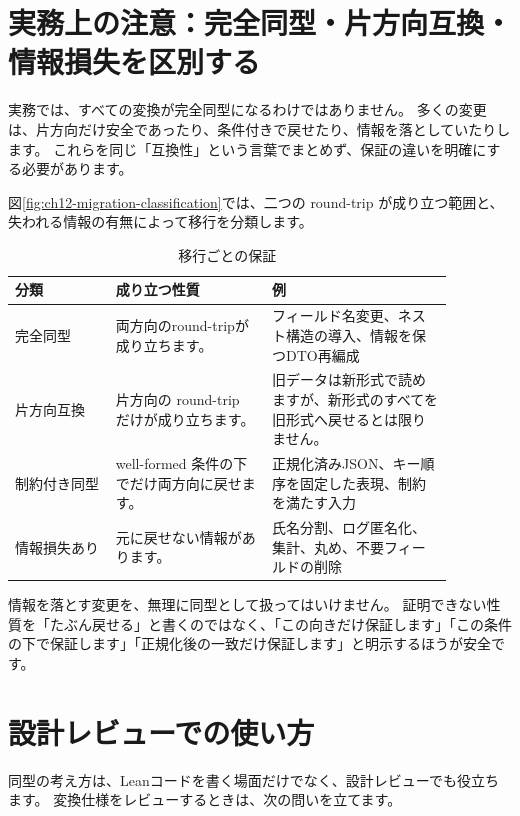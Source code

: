 \section{実務上の注意：完全同型・片方向互換・情報損失を区別する}
\label{sec:ch12-practical-classification}

実務では、すべての変換が完全同型になるわけではありません。
多くの変更は、片方向だけ安全であったり、条件付きで戻せたり、情報を落としていたりします。
これらを同じ「互換性」という言葉でまとめず、保証の違いを明確にする必要があります。

図\ref{fig:ch12-migration-classification}では、二つの round-trip が成り立つ範囲と、失われる情報の有無によって移行を分類します。


\begin{table}[htbp]
\centering
\begin{tabular}{p{0.20\linewidth}p{0.31\linewidth}p{0.36\linewidth}}
\toprule
分類 & 成り立つ性質 & 例 \\
\midrule
完全同型 & 両方向のround-tripが成り立ちます。 & フィールド名変更、ネスト構造の導入、情報を保つDTO再編成 \\
片方向互換 & 片方向の round-trip だけが成り立ちます。
& 旧データは新形式で読めますが、新形式のすべてを旧形式へ戻せるとは限りません。 \\
制約付き同型 & well-formed 条件の下でだけ両方向に戻せます。 & 正規化済みJSON、キー順序を固定した表現、制約を満たす入力 \\
情報損失あり & 元に戻せない情報があります。 & 氏名分割、ログ匿名化、集計、丸め、不要フィールドの削除 \\
\bottomrule
\end{tabular}
\caption{移行ごとの保証}
\label{tab:ch12-migration-classification}
\end{table}

情報を落とす変更を、無理に同型として扱ってはいけません。
証明できない性質を「たぶん戻せる」と書くのではなく、「この向きだけ保証します」「この条件の下で保証します」「正規化後の一致だけ保証します」と明示するほうが安全です。

\section{設計レビューでの使い方}
\label{sec:ch12-review}

同型の考え方は、Leanコードを書く場面だけでなく、設計レビューでも役立ちます。
変換仕様をレビューするときは、次の問いを立てます。

